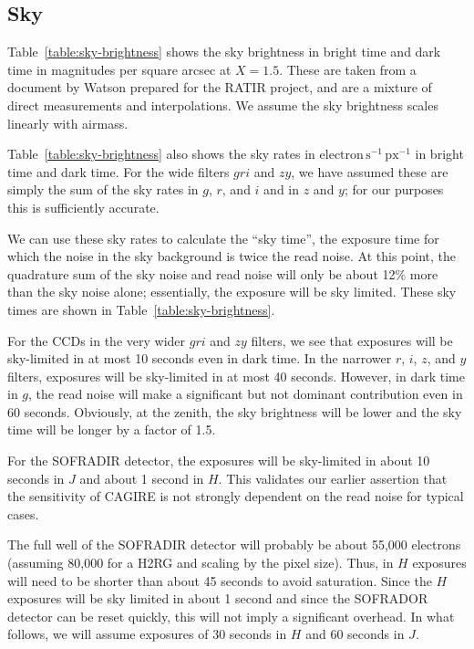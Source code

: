 \documentclass{article}
\begin{document}
\subsection{Sky}

Table~\ref{table:sky-brightness} shows the sky brightness in bright time and dark time in magnitudes per square arcsec at $X = 1.5$. These are taken from a document by Watson prepared for the RATIR project, and are a mixture of direct measurements and interpolations. We assume the sky brightness scales linearly with airmass.

Table~\ref{table:sky-brightness} also shows the sky rates in $\mathrm{electron\,s^{-1}\,px^{-1}}$ in bright time and dark time. For the wide filters $gri$ and $zy$, we have assumed these are simply the sum of the sky rates in $g$, $r$, and $i$ and in $z$ and $y$; for our purposes this is sufficiently accurate.

We can use these sky rates to calculate the “sky time”, the exposure time for which the noise in the sky background is twice the read noise. At this point, the quadrature sum of the sky noise and read noise will only be about 12\% more than the sky noise alone; essentially, the exposure will be sky limited. These sky times are shown in Table~\ref{table:sky-brightness}.

For the CCDs in the very wider $gri$ and $zy$ filters, we see that exposures will be sky-limited in at most 10 seconds even in dark time. In the narrower $r$, $i$, $z$, and $y$ filters, exposures will be sky-limited in at most 40 seconds. However, in dark time in $g$, the read noise will make a significant but not dominant contribution even in 60 seconds. Obviously, at the zenith, the sky brightness will be lower and the sky time will be longer by a factor of 1.5.

For the SOFRADIR detector, the exposures will be sky-limited in about 10 seconds in $J$ and about 1 second in $H$. This validates our earlier assertion that the sensitivity of CAGIRE is not strongly dependent on the read noise for typical cases.

The full well of the SOFRADIR detector will probably be about 55,000 electrons (assuming 80,000 for a H2RG and scaling by the pixel size). Thus, in $H$ exposures will need to be shorter than about 45 seconds to avoid saturation. Since the $H$ exposures will be sky limited in about 1 second and since the SOFRADOR detector can be reset quickly, this will not imply a significant overhead. In what follows, we will assume exposures of 30 seconds in $H$ and 60 seconds in $J$.
\end{document}
